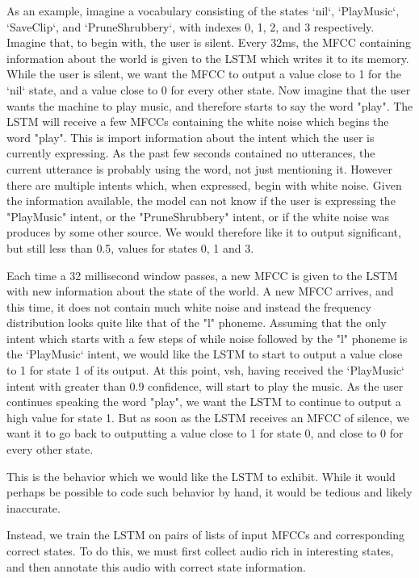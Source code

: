 \documentclass[conference]{IEEEtran}
\begin{document}
As an example, imagine a vocabulary consisting of the states `nil`, `PlayMusic`, `SaveClip`, and `PruneShrubbery`, with indexes 0, 1, 2, and 3 respectively.
Imagine that, to begin with, the user is silent.
Every 32ms, the MFCC containing information about the world is given to the LSTM which writes it to its memory.
While the user is silent, we want the MFCC to output a value close to 1 for the `nil` state, and a value close to 0 for every other state.
Now imagine that the user wants the machine to play music, and therefore starts to say the word "play".
The LSTM will receive a few MFCCs containing the white noise which begins the word "play".
This is import information about the intent which the user is currently expressing.
As the past few seconds contained no utterances, the current utterance is probably using the word, not just mentioning it.
However there are multiple intents which, when expressed, begin with white noise.
Given the information available, the model can not know if the user is expressing the "PlayMusic" intent, or the "PruneShrubbery" intent, or if the white noise was produces by some other source.
We would therefore like it to output significant, but still less than 0.5, values for states 0, 1 and 3.

Each time a 32 millisecond window passes, a new MFCC is given to the LSTM with new information about the state of the world.
A new MFCC arrives, and this time, it does not contain much white noise and instead the frequency distribution looks quite like that of the "l" phoneme.
Assuming that the only intent which starts with a few steps of while noise followed by the "l" phoneme is the `PlayMusic` intent, we would like the LSTM to start to output a value close to 1 for state 1 of its output.
At this point, vsh, having received the `PlayMusic` intent with greater than 0.9 confidence, will start to play the music.
As the user continues speaking the word "play", we want the LSTM to continue to output a high value for state 1.
But as soon as the LSTM receives an MFCC of silence, we want it to go back to outputting a value close to 1 for state 0, and close to 0 for every other state.

This is the behavior which we would like the LSTM to exhibit.
While it would perhaps be possible to code such behavior by hand, it would be tedious and likely inaccurate.

Instead, we train the LSTM on pairs of lists of input MFCCs and corresponding correct states.
To do this, we must first collect audio rich in interesting states, and then annotate this audio with correct state information.
\end{document}
